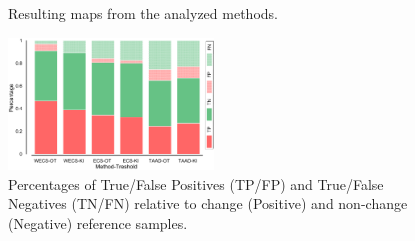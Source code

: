 \documentclass[journal]{IEEEtran}
\begin{document}
\begin{figure}[h!]
\centering

\mbox{
}

\mbox{
}

\caption{Resulting maps from the analyzed methods.}\label{figSentinelResults}
\end{figure}




\begin{figure}[hbt]
\centering
\includegraphics[width=0.485\textwidth]{../../graphs/TPTNs.pdf}
\caption{Percentages of True/False Positives (TP/FP) and True/False Negatives (TN/FN) relative to change (Positive) and non-change (Negative) reference samples.}\label{figTPTNs}
\end{figure}
\end{document}
